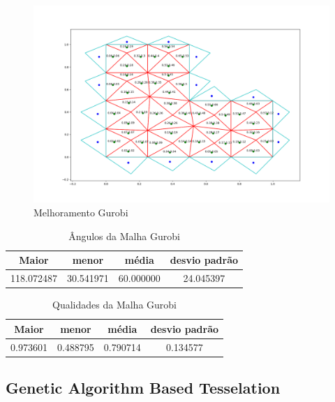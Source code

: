 \begin{figure}[ht]
    \centering
    \includegraphics[width=1\linewidth]{fig/malha-gurobi.png}
    \caption{Melhoramento Gurobi}
    \label{fig:malha-gurobi}
\end{figure}

\begin{table}[hb]
\centering
\par\caption{Ângulos da Malha Gurobi}
\begin{tabular}{c|c|c|c}
Maior&menor&média&desvio padrão\\\hline\hline
118.072487&30.541971&60.000000&24.045397\\\hline
\end{tabular}
\label{tab:angulos-malha-gurobi}
\end{table}

\begin{table}[hb]
\centering
\par\caption{Qualidades da Malha Gurobi}
\begin{tabular}{c|c|c|c}
Maior&menor&média&desvio padrão\\\hline\hline
0.973601&0.488795&0.790714&0.134577\\\hline
\end{tabular}
\label{tab:qualidades-malha-gurobi}
\end{table}

\newpage
\subsection{Genetic Algorithm Based Tesselation}

